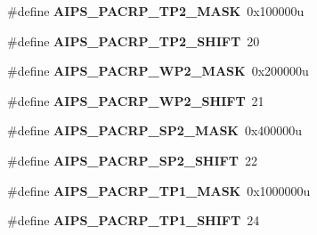\begin{DoxyCompactItemize}
\item 
\hypertarget{group___a_i_p_s___register___masks_gabbf84d32f844ae913a51937ca5fa690d}{}\#define {\bfseries A\+I\+P\+S\+\_\+\+P\+A\+C\+R\+P\+\_\+\+T\+P2\+\_\+\+M\+A\+S\+K}~0x100000u\label{group___a_i_p_s___register___masks_gabbf84d32f844ae913a51937ca5fa690d}

\item 
\hypertarget{group___a_i_p_s___register___masks_gac3b6d0afb09bc7189cc8dedbdadb786e}{}\#define {\bfseries A\+I\+P\+S\+\_\+\+P\+A\+C\+R\+P\+\_\+\+T\+P2\+\_\+\+S\+H\+I\+F\+T}~20\label{group___a_i_p_s___register___masks_gac3b6d0afb09bc7189cc8dedbdadb786e}

\item 
\hypertarget{group___a_i_p_s___register___masks_gaf7f22f436d3d6587799302a87b7013d2}{}\#define {\bfseries A\+I\+P\+S\+\_\+\+P\+A\+C\+R\+P\+\_\+\+W\+P2\+\_\+\+M\+A\+S\+K}~0x200000u\label{group___a_i_p_s___register___masks_gaf7f22f436d3d6587799302a87b7013d2}

\item 
\hypertarget{group___a_i_p_s___register___masks_ga71a6e2fdd8459cd3104879db97c51b55}{}\#define {\bfseries A\+I\+P\+S\+\_\+\+P\+A\+C\+R\+P\+\_\+\+W\+P2\+\_\+\+S\+H\+I\+F\+T}~21\label{group___a_i_p_s___register___masks_ga71a6e2fdd8459cd3104879db97c51b55}

\item 
\hypertarget{group___a_i_p_s___register___masks_gaad5030229911dedc5d1128a6e46ff0cb}{}\#define {\bfseries A\+I\+P\+S\+\_\+\+P\+A\+C\+R\+P\+\_\+\+S\+P2\+\_\+\+M\+A\+S\+K}~0x400000u\label{group___a_i_p_s___register___masks_gaad5030229911dedc5d1128a6e46ff0cb}

\item 
\hypertarget{group___a_i_p_s___register___masks_ga34cbbd43766ea51cdbe60858d5e612d5}{}\#define {\bfseries A\+I\+P\+S\+\_\+\+P\+A\+C\+R\+P\+\_\+\+S\+P2\+\_\+\+S\+H\+I\+F\+T}~22\label{group___a_i_p_s___register___masks_ga34cbbd43766ea51cdbe60858d5e612d5}

\item 
\hypertarget{group___a_i_p_s___register___masks_ga2fe235c806d77fa5d23c0fcac9049290}{}\#define {\bfseries A\+I\+P\+S\+\_\+\+P\+A\+C\+R\+P\+\_\+\+T\+P1\+\_\+\+M\+A\+S\+K}~0x1000000u\label{group___a_i_p_s___register___masks_ga2fe235c806d77fa5d23c0fcac9049290}

\item 
\hypertarget{group___a_i_p_s___register___masks_gaa40b9ae55dc39d99d8dba579a1093059}{}\#define {\bfseries A\+I\+P\+S\+\_\+\+P\+A\+C\+R\+P\+\_\+\+T\+P1\+\_\+\+S\+H\+I\+F\+T}~24\label{group___a_i_p_s___register___masks_gaa40b9ae55dc39d99d8dba579a1093059}


\end{DoxyCompactItemize}
